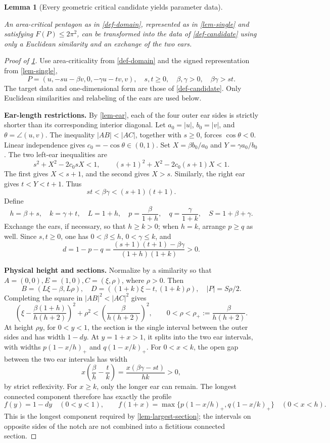 \documentclass[11pt,a4paper]{article}
\theoremstyle{proofmanuscript}
\newtheorem{lemma}[theorem]{Lemma}
\begin{document}
\begin{lemma}[Every geometric critical candidate yields parameter data]\label{lem-geometry-input}

An area-critical pentagon as in \ref{def-domain}, represented as in \ref{lem-single} and satisfying \(F(P)\le2\pi^2\), can be transformed into the data of \ref{def-candidate} using only a Euclidean similarity and an exchange of the two ears.

\end{lemma}

\begin{proof}[Proof of \ref{lem-geometry-input}]

Use area-criticality from \ref{def-domain} and the signed representation from \ref{lem-single}, \[
P=(u,-su-\beta v,0,-\gamma u-tv,v),
\quad s,t\ge0,\quad\beta,\gamma>0,\quad\beta\gamma>st.
\] The target data and one-dimensional form are those of \ref{def-candidate}. Only Euclidean similarities and relabeling of the ears are used below.

\textbf{Ear-length restrictions.} By \ref{lem-ear}, each of the four outer ear sides is strictly shorter than its corresponding interior diagonal. Let \(a_0=|u|\), \(b_0=|v|\), and \(\theta=\angle(u,v)\). The inequality \(|AB|<|AC|\), together with \(s\ge0\), forces \(\cos\theta<0\). Linear independence gives \(c_0=-\cos\theta\in(0,1)\). Set \(X=\beta b_0/a_0\) and \(Y=\gamma a_0/b_0\). The two left-ear inequalities are \[
s^2+X^2-2c_0sX<1,\qquad
(s+1)^2+X^2-2c_0(s+1)X<1.
\] The first gives \(X<s+1\), and the second gives \(X>s\). Similarly, the right ear gives \(t<Y<t+1\). Thus \[
st<\beta\gamma<(s+1)(t+1).\tag{G.6.3}
\] Define \[
h=\beta+s,\quad k=\gamma+t,\quad L=1+h,\quad
p=\frac\beta{1+h},\quad q=\frac\gamma{1+k},\quad S=1+\beta+\gamma.
\] Exchange the ears, if necessary, so that \(h\ge k>0\); when \(h=k\), arrange \(p\ge q\) as well. Since \(s,t\ge0\), one has \(0<\beta\le h\), \(0<\gamma\le k\), and \[
d=1-p-q=
\frac{(s+1)(t+1)-\beta\gamma}{(1+h)(1+k)}>0.\tag{G.6.5}
\]

\textbf{Physical height and sections.} Normalize by a similarity so that \(A=(0,0),E=(1,0),C=(\xi,\rho)\), where \(\rho>0\). Then \[
B=(L\xi-\beta,L\rho),\quad
D=((1+k)\xi-t,(1+k)\rho),\quad |P|=S\rho/2.\tag{G.7.1}
\] Completing the square in \(|AB|^2<|AC|^2\) gives \[
\left(\xi-\frac{\beta(1+h)}{h(h+2)}\right)^2+\rho^2
<\left(\frac\beta{h(h+2)}\right)^2,
\qquad 0<\rho<\rho_+:=\frac\beta{h(h+2)}.\tag{G.7.2}
\] At height \(\rho y\), for \(0<y<1\), the section is the single interval between the outer sides and has width \(1-dy\). At \(y=1+x>1\), it splits into the two ear intervals, with widths \(p(1-x/h)_+\) and \(q(1-x/k)_+\). For \(0<x<k\), the open gap between the two ear intervals has width \[
x\left(\frac\beta h-\frac t k\right)=\frac{x(\beta\gamma-st)}{hk}>0,
\] by strict reflexivity. For \(x\ge k\), only the longer ear can remain. The longest connected component therefore has exactly the profile \[
f(y)=1-dy\quad(0<y<1),\qquad
f(1+x)=\max\{p(1-x/h)_+,q(1-x/k)_+\}\quad(0<x<h).\tag{G.7.3}
\] This is the longest component required by \ref{lem-largest-section}; the intervals on opposite sides of the notch are not combined into a fictitious connected section.


\end{proof}
\end{document}
